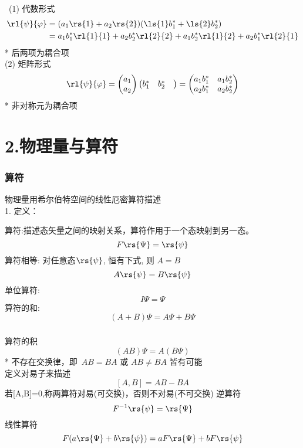 \begin{frame} 
\frametitle{}
 \例 [3. 求如下波函数的外积]{
 \[\rs{\psi}= a_1 \rs{1} + a_2 \rs{2}, \quad \rs{\varphi}= b_1 \rs{1} + b_2 \rs{2} \]}
 \解 ~(1) 代数形式 
   \[ \begin{aligned}
    \rl{\psi}{\varphi} &= (a_1 \rs{1} + a_2 \rs{2}) (\ls{1}b_1 ^*  + \ls{2} b_2 ^* )\\
      &= a_1 b_1 ^* \rl{1}{1} + a_2 b_2 ^* \rl{2}{2} + a_1 b_2 ^* \rl{1}{2} + a_2 b_1 ^* \rl{2}{1} \\
   \end{aligned}\]   
* 后两项为耦合项\\ 
(2) 矩阵形式
~ \[\rl{\psi}{\varphi} = \begin{pmatrix}
    a_1  \\
    a_2  
\end{pmatrix}
    \begin{pmatrix}
    b_1 ^* &
    b_2 ^* &
\end{pmatrix}
=  \begin{pmatrix}
    a_1b_1 ^* & a_1b_2 ^*  \\
    a_2b_1 ^* & a_2b_2 ^*  
\end{pmatrix}
\]
* 非对称元为耦合项
\end{frame}

\section{2.物理量与算符}

\begin{frame}
    \frametitle{算符}
    物理量用希尔伯特空间的线性厄密算符描述\\
    1. 定义：
    \begin{itemize}
        \Item 算符:描述态矢量之间的映射关系，算符作用于一个态映射到另一态。
        \[F \rs{\Psi}=\rs{\psi}\]
        \Item 算符相等: 对任意态$\rs{\psi}$, 恒有下式, 则 $A= B$ \[ A\rs{\psi}=B\rs{\psi}\]
        \Item 单位算符: \[I\Psi=\Psi \]
        \Item 算符的和:  
        $$ (A+B)\Psi=A\Psi+B\Psi $$   
    \end{itemize}
\end{frame} 

\begin{frame}
 \frametitle{}
 \begin{itemize}
    \Item 算符的积 
    $$ (AB)\Psi=A(B\Psi) $$
    * 不存在交换律，即 $AB=BA$ 或 $AB\ne BA$ 皆有可能 \\
    定义对易子来描述 \\
    $$ [A,B]=AB-BA$$
    若[A,B]=0,称两算符对易(可交换)，否则不对易(不可交换)
    \Item 逆算符  
    \[F^{-1}\rs{\psi}=\rs{\Psi} \] 
    \Item 线性算符 \[F (a\rs{\Psi} +b\rs{\psi}) = aF \rs{\Psi} +bF\rs{\psi}\]
\end{itemize}
\end{frame}

